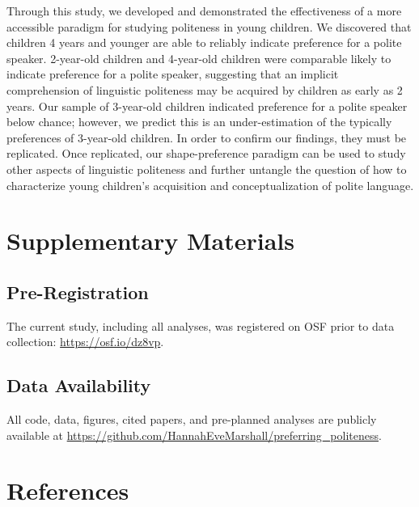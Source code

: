\documentclass[
  english,
  man,floatsintext]{apa6}
\begin{document}
Through this study, we developed and demonstrated the effectiveness of a more accessible paradigm for studying politeness in young children. We discovered that children 4 years and younger are able to reliably indicate preference for a polite speaker. 2-year-old children and 4-year-old children were comparable likely to indicate preference for a polite speaker, suggesting that an implicit comprehension of linguistic politeness may be acquired by children as early as 2 years. Our sample of 3-year-old children indicated preference for a polite speaker below chance; however, we predict this is an under-estimation of the typically preferences of 3-year-old children. In order to confirm our findings, they must be replicated. Once replicated, our shape-preference paradigm can be used to study other aspects of linguistic politeness and further untangle the question of how to characterize young children's acquisition and conceptualization of polite language.

\hypertarget{supplementary-materials}{%
\section{Supplementary Materials}\label{supplementary-materials}}

\hypertarget{pre-registration}{%
\subsection{Pre-Registration}\label{pre-registration}}

The current study, including all analyses, was registered on OSF prior to data collection: \url{https://osf.io/dz8vp}.

\hypertarget{data-availability}{%
\subsection{Data Availability}\label{data-availability}}

All code, data, figures, cited papers, and pre-planned analyses are publicly available at \url{https://github.com/HannahEveMarshall/preferring_politeness}.

\newpage

\hypertarget{references}{%
\section{References}\label{references}}

\begingroup
\setlength{\parindent}{-0.5in}
\setlength{\leftskip}{0.5in}
\end{document}
